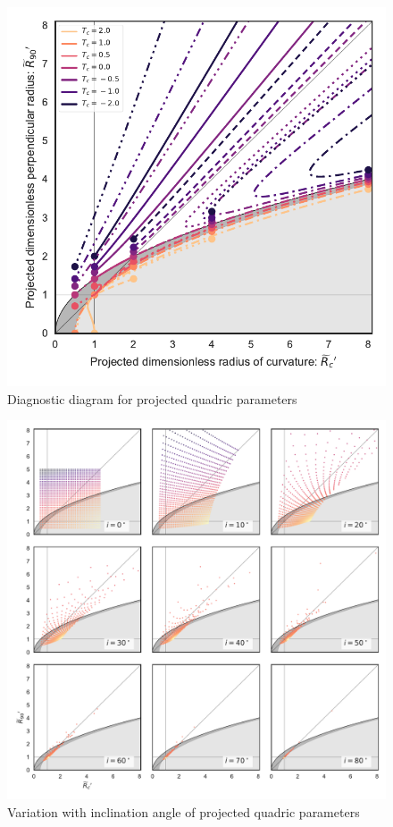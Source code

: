 \begin{figure}
  \centering
  \includegraphics[width=\linewidth]{figs/projected-R90-vs-Rc}
  \caption{Diagnostic diagram for projected quadric parameters}
  \label{fig:projected-R90-vs-Rc}
\end{figure}
\begin{figure}
  \centering
  \includegraphics[width=\linewidth]{figs/projected-R90-Rc-snapshots}
  \caption{Variation with inclination angle of projected quadric parameters}
  \label{fig:projected-R90-Rc-snapshots}
\end{figure}
